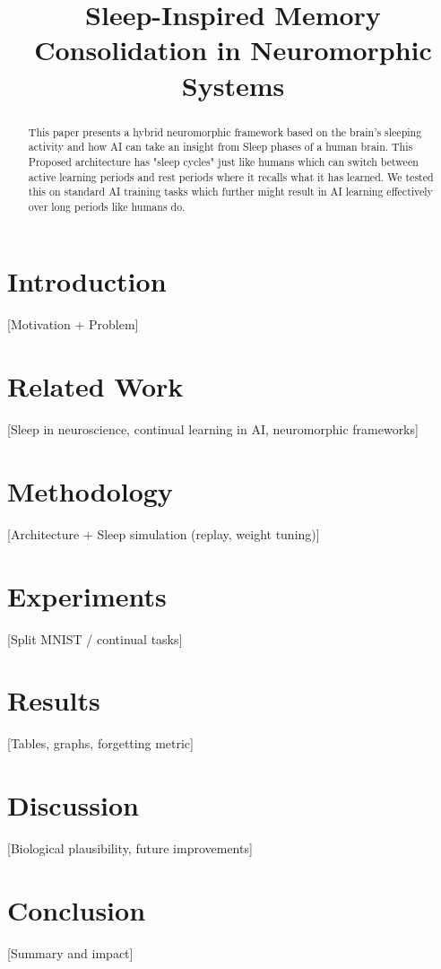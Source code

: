 \documentclass[conference]{IEEEtran}
\title{Sleep-Inspired Memory Consolidation in Neuromorphic Systems}
\author{\IEEEauthorblockN{Raunak Lakhmani}
\IEEEauthorblockA{Amity University \\ raunak.lakhmani@s.amity.edu}
}
\begin{document}
\maketitle

\begin{abstract}
This paper presents a hybrid neuromorphic framework based on the brain's sleeping activity and how AI can take an insight from Sleep phases of a human brain. This Proposed architecture has "sleep cycles" just like humans which can switch between active learning periods and rest periods where it recalls what it has learned. We tested this on standard AI training tasks which further might result in AI learning effectively over long periods like humans do.
\end{abstract}

\section{Introduction}
[Motivation + Problem]

\section{Related Work}
[Sleep in neuroscience, continual learning in AI, neuromorphic frameworks]

\section{Methodology}
[Architecture + Sleep simulation (replay, weight tuning)]

\section{Experiments}
[Split MNIST / continual tasks]

\section{Results}
[Tables, graphs, forgetting metric]

\section{Discussion}
[Biological plausibility, future improvements]

\section{Conclusion}
[Summary and impact]



\end{document}
